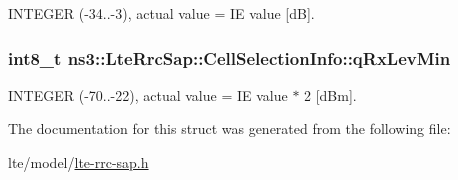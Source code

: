 I\+N\+T\+E\+G\+ER (-\/34..-\/3), actual value = IE value \mbox{[}dB\mbox{]}. 

\subsubsection[{\texorpdfstring{q\+Rx\+Lev\+Min}{qRxLevMin}}]{\setlength{\rightskip}{0pt plus 5cm}int8\+\_\+t ns3\+::\+Lte\+Rrc\+Sap\+::\+Cell\+Selection\+Info\+::q\+Rx\+Lev\+Min}\hypertarget{structns3_1_1LteRrcSap_1_1CellSelectionInfo_a6827f809e7596ce3eb122d5cc7b5b881}{}\label{structns3_1_1LteRrcSap_1_1CellSelectionInfo_a6827f809e7596ce3eb122d5cc7b5b881}


I\+N\+T\+E\+G\+ER (-\/70..-\/22), actual value = IE value $\ast$ 2 \mbox{[}d\+Bm\mbox{]}. 



The documentation for this struct was generated from the following file\+:\begin{DoxyCompactItemize}
\item 
lte/model/\hyperlink{lte-rrc-sap_8h}{lte-\/rrc-\/sap.\+h}\end{DoxyCompactItemize}
